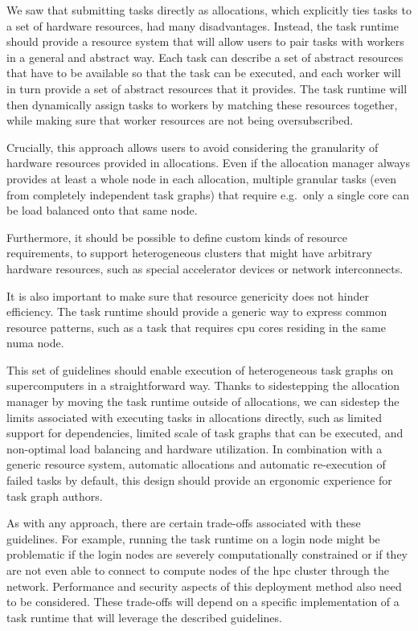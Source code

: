 \begin{description}[wide=0pt]
		We saw that submitting tasks directly as allocations, which explicitly ties tasks to a set of
		hardware resources, had many disadvantages. Instead, the task runtime should provide a resource
		system that will allow users to pair tasks with workers in a general and abstract way. Each task
		can describe a set of abstract resources that have to be available so that the task can be
		executed, and each worker will in turn provide a set of abstract resources that it provides. The
		task runtime will then dynamically assign tasks to workers by matching these resources together,
		while making sure that worker resources are not being oversubscribed.

		Crucially, this approach allows users to avoid considering the granularity of hardware resources
		provided in allocations. Even if the allocation manager always provides at least a whole node in
		each allocation, multiple granular tasks (even from completely independent task graphs) that
		require e.g.\ only a single core can be load balanced onto that same node.

		Furthermore, it should be possible to define custom kinds of resource requirements, to support
		heterogeneous clusters that might have arbitrary hardware resources, such as special accelerator
		devices or network interconnects.

		It is also important to make sure that resource genericity does not hinder efficiency. The task
		runtime should provide a generic way to express common resource patterns, such as a task that
		requires \gls{cpu} cores residing in the same \gls{numa} node.
\end{description}

This set of guidelines should enable execution of heterogeneous task graphs on supercomputers in a
straightforward way. Thanks to sidestepping the allocation manager by moving the task runtime
outside of allocations, we can sidestep the limits associated with executing tasks in allocations
directly, such as limited support for dependencies, limited scale of task graphs that can be
executed, and non-optimal load balancing and hardware utilization. In combination with a generic
resource system, automatic allocations and automatic re-execution of failed tasks by default, this
design should provide an ergonomic experience for task graph authors.

As with any approach, there are certain trade-offs associated with these guidelines. For example,
running the task runtime on a login node might be problematic if the login nodes are severely
computationally constrained or if they are not even able to connect to compute nodes of the
\gls{hpc} cluster through the network. Performance and security aspects of this
deployment method also need to be considered. These trade-offs will depend on a specific
implementation of a task runtime that will leverage the described guidelines.

